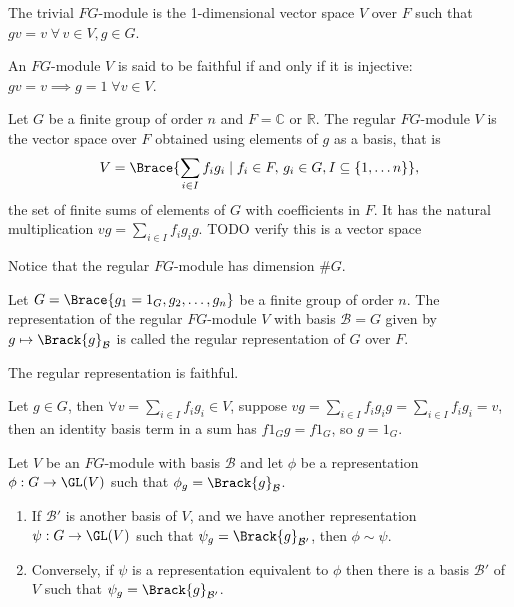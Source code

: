 \documentclass[../Project.tex]{subfiles}
\begin{document}
\begin{defi}
	The trivial $FG$-module is the 1-dimensional vector space $V$ over $F$ such that
	$gv = v\;\forall\,v \in V, g \in G$.
\end{defi}

\begin{defi}
	An $FG$-module $V$ is said to be faithful if and only if it is injective: $gv = v \implies g = 1\; \forall v \in V$.
\end{defi}


\begin{defi}
	Let $G$ be a finite group of order $n$ and $F = \mathbb{C}$ or $\mathbb{R}$. The regular $FG$-module $V$ is the vector space over $F$ obtained using elements of $g$ as a basis, that is 
	$$V = \Brace{\sum_{i \in I}f_ig_i \;\vert\; f_i \in F,\,g_i \in G, I \subseteq \{1,\dots n\}},$$
	the set of finite sums of elements of $G$ with coefficients in $F$.
	It has the natural multiplication $vg = \sum\limits_{i \in I}f_ig_ig$.
	TODO verify this is a vector space

	Notice that the regular $FG$-module has dimension $\#G$.
\end{defi}

\begin{defi}
	Let $G = \Brace{g_1 = 1_G,g_2, \dots, g_n}$ be a finite group of order $n$. The representation of the regular $FG$-module $V$ with basis $\mathcal{B} = G$ given by $g \mapsto \Brack{g}_\mathcal{B}$ is called the regular representation of $G$ over $F$.
\end{defi}

\begin{prop}[\cite{2}]
	The regular representation is faithful.
\end{prop}
\begin{proo*}
	Let $g \in G$, then $\forall v = \sum\limits_{i \in I}f_ig_i \in V$, suppose $vg = \sum\limits_{i \in I}f_ig_ig = \sum\limits_{i \in I}f_ig_i  = v$, then an identity basis term in a sum has $f1_Gg = f1_G$, so $g = 1_G$.
\end{proo*}

\begin{theo}[\cite{2}]
\label{5}
	Let $V$ be an $FG$-module with basis $\mathcal{B}$ and let $\phi$ be a representation $\phi : G \to \GL(V)$ such that $\phi_g = \Brack{g}_\mathcal{B}$.
	\begin{enumerate}
	\item If $\mathcal{B}'$ is another basis of $V$, and we have another representation $\psi : G \to \GL(V)$ such that $\psi_g = \Brack{g}_{\mathcal{B}'}$, then $\phi \sim \psi$.
	\item Conversely, if $\psi$ is a representation equivalent to $\phi$ then there is a basis $\mathcal{B}'$ of $V$ such that $\psi_g = \Brack{g}_{\mathcal{B}'}$.
	\end{enumerate}
\end{theo}
\end{document}
